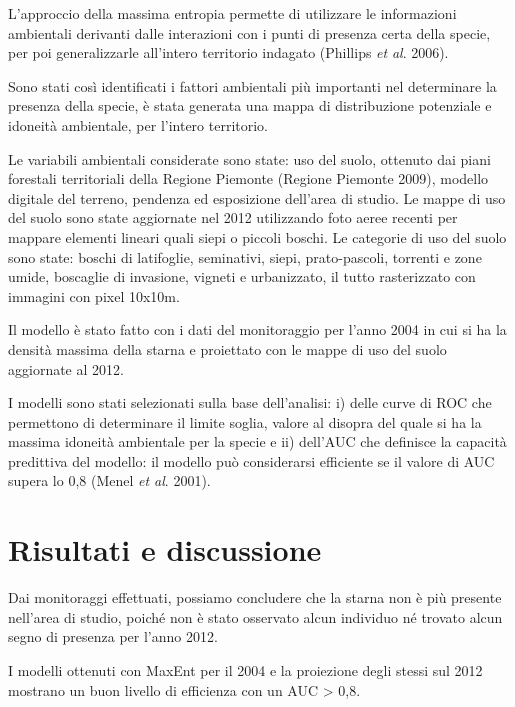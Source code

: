 L'approccio della massima entropia permette di
utilizzare le informazioni ambientali derivanti dalle interazioni con i
punti di presenza certa della specie, per poi generalizzarle
all'intero territorio indagato (Phillips \textit{et}
\textit{al}. 2006). 

Sono stati cos\`i identificati i fattori ambientali pi\`u importanti nel
determinare la presenza della specie, \`e stata generata una mappa di
distribuzione potenziale e idoneit\`a ambientale, per
l'intero territorio.

{Le variabili ambientali considerate sono state: uso
del suolo, ottenuto dai piani forestali territoriali della Regione
Piemonte (Regione Piemonte 2009), modello digitale del terreno,
pendenza ed esposizione dell'area di studio. Le mappe
di uso del suolo sono state aggiornate nel 2012 utilizzando foto aeree
recenti per mappare elementi lineari quali siepi o piccoli boschi. Le
categorie di uso del suolo sono state: boschi di latifoglie,
seminativi, siepi, prato-pascoli, torrenti e zone umide, boscaglie di
invasione, vigneti e urbanizzato, il tutto rasterizzato con immagini
con pixel 10x10m.  }

Il modello \`e stato fatto con i dati del monitoraggio per
l'anno 2004 in cui si ha la densit\`a massima della
starna e proiettato con le mappe di uso del suolo aggiornate al 2012.

I modelli sono stati selezionati sulla base
dell'analisi: i) delle curve di ROC che permettono di
determinare il limite soglia, valore al disopra del quale si ha la
massima idoneit\`a ambientale per la specie e ii)
dell'AUC che definisce la capacit\`a predittiva del
modello: il modello pu\`o considerarsi efficiente se il valore di AUC
supera lo 0,8 (Menel \textit{et al}. 2001).

\section*{Risultati e discussione}

Dai monitoraggi effettuati, possiamo concludere che la starna non \`e
pi\`u presente nell'area di studio, poich\'e non \`e
stato osservato alcun individuo n\'e trovato alcun segno di presenza
per l'anno 2012. 

I modelli ottenuti con MaxEnt per il 2004 e la proiezione degli stessi
sul 2012 mostrano un buon livello di efficienza con un AUC
{\textgreater} 0,8.

